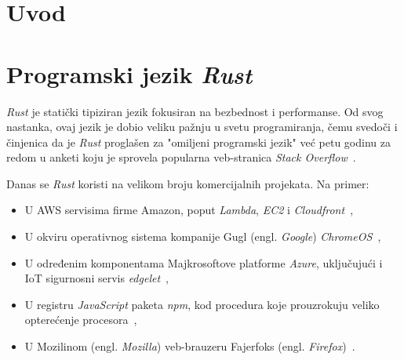 \documentclass[12pt,oneside]{memoir}
\begin{document}
\frontmatter
\naslovna
\komisija
\apstrakt
\tableofcontents*

\mainmatter

\chapter{Uvod}
\chapter{Programski jezik \emph{Rust}}
\emph{Rust} je statički tipiziran jezik  fokusiran na bezbednost i
performanse. Od svog nastanka, ovaj jezik
je dobio veliku pažnju u svetu programiranja, čemu svedoči i činjenica da je
\emph{Rust} proglašen za "omiljeni programski jezik" već petu godinu za redom
u anketi koju je sprovela popularna veb-stranica \emph{Stack Overflow}~\cite{mostloved_so}.

Danas se \emph{Rust} koristi na velikom broju komercijalnih projekata. Na primer:

\begin{itemize}
    \item U AWS servisima firme Amazon, poput \emph{Lambda}, \emph{EC2}
        i \emph{Cloudfront}~\cite{aws},
    \item U okviru operativnog sistema kompanije Gugl (engl. \emph{Google})
        \emph{ChromeOS}~\cite{crosvm},
    \item U određenim komponentama Majkrosoftove platforme \emph{Azure}, uključujući i
        IoT sigurnosni servis \emph{edgelet}~\cite{edgelet},
    \item U registru \emph{JavaScript} paketa \emph{npm},
        kod procedura koje prouzrokuju veliko opterećenje procesora~\cite{npm},
    \item U Mozilinom (engl. \emph{Mozilla}) veb-brauzeru Fajerfoks
        (engl. \emph{Firefox})~\cite{firefox_rust}.
\end{itemize}
\end{document}
